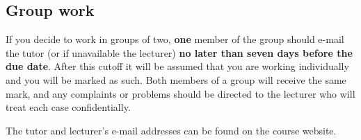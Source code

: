 \subsection*{Group work}

If you decide to work in groups of two, \textbf{one} member of the group should
e-mail the tutor (or if unavailable the lecturer) \textbf{no later than seven
days before the due date}.  After this cutoff it will be assumed that you are
working individually and you will be marked as such. Both members of a
group will receive the same mark, and any complaints or problems should be
directed to the lecturer who will treat each case confidentially.

The tutor and lecturer's e-mail addresses can be found on the course website.
